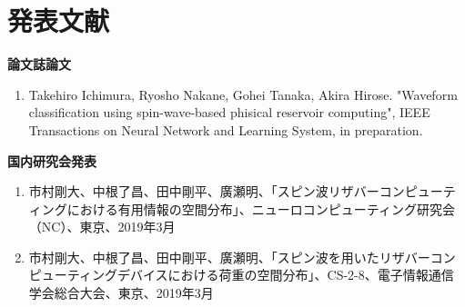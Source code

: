 \documentclass[a4j, twocolumn]{jsarticle}
\begin{document}



\section*{発表文献}
{\bf 論文誌論文}
\begin{enumerate}
\item Takehiro Ichimura, Ryosho Nakane, Gohei Tanaka, Akira Hirose. "Waveform classification using spin-wave-based phisical reservoir computing", IEEE Transactions on Neural Network and Learning System, in preparation.
\end{enumerate}


{\bf 国内研究会発表}
\begin{enumerate}
\item 市村剛大、中根了昌、田中剛平、廣瀬明、「スピン波リザバーコンピューティングにおける有用情報の空間分布」、ニューロコンピューティング研究会（NC）、東京、2019年3月
\item 市村剛大、中根了昌、田中剛平、廣瀬明、「スピン波を用いたリザバーコンピューティングデバイスにおける荷重の空間分布」、CS-2-8、電子情報通信学会総合大会、東京、2019年3月
\end{enumerate}
\end{document}
